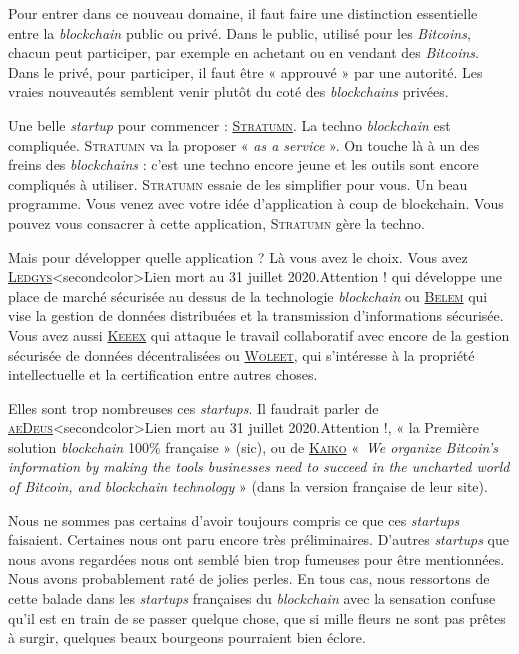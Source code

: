 Pour entrer dans ce nouveau domaine, il faut faire une distinction essentielle entre la \textit{blockchain} public ou privé. Dans le public, utilisé pour les \textit{Bitcoins}, chacun peut participer, par exemple en achetant ou en vendant des \textit{Bitcoins}. Dans le privé, pour participer, il faut être « approuvé » par une autorité. Les vraies nouveautés semblent venir plutôt du coté des \textit{blockchains} privées.

Une belle \textit{startup} pour commencer : \href{https://www.stratumn.com/}{\textsc{Stratumn}}. La techno \textit{blockchain} est compliquée. \textsc{Stratumn} va la proposer « \textit{as a service} ». On touche là à un des freins des \textit{blockchains} : c’est une techno encore jeune et les outils sont encore compliqués à utiliser. \textsc{Stratumn} essaie de les simplifier pour vous. Un beau programme. Vous venez avec votre idée d’application à coup de blockchain. Vous pouvez vous consacrer à cette application, \textsc{Stratumn} gère la techno.

Mais pour développer quelle application ? Là vous avez le choix. Vous avez \href{http://ledgys.io/}{\textsc{Ledgys}}\caution[t]<secondcolor>{Lien mort au 31 juillet 2020.}{Attention !} qui développe une place de marché sécurisée au dessus de la technologie \textit{blockchain} ou \href{https://belem.io/}{\textsc{Belem}} qui vise la gestion de données distribuées et la transmission d’informations sécurisée. Vous avez aussi \href{https://keeex.me/fr/}{\textsc{Keeex}} qui attaque le travail collaboratif avec encore de la gestion sécurisée de données décentralisées ou \href{https://www.woleet.io/}{\textsc{Woleet}}, qui s’intéresse à la propriété intellectuelle et la certification entre autres choses.

Elles sont trop nombreuses ces \textit{startups}. Il faudrait parler de \href{www.aedeus.com}{\textsc{aeDeus}}\caution[t]<secondcolor>{Lien mort au 31 juillet 2020.}{Attention !}, « la Première solution \textit{blockchain} 100\% française » (sic), ou de \href{https://www.kaiko.com/}{\textsc{Kaiko}} «~\textit{We organize Bitcoin’s information by making the tools businesses need to succeed in the uncharted world of Bitcoin, and blockchain technology} » (dans la version française de leur site).

Nous ne sommes pas certains d’avoir toujours compris ce que ces \textit{startups} faisaient. Certaines nous ont paru encore très préliminaires. D’autres \textit{startups} que nous avons regardées nous ont semblé bien trop fumeuses pour être mentionnées. Nous avons probablement raté de jolies perles. En tous cas, nous ressortons de cette balade dans les \textit{startups} françaises du \textit{blockchain} avec la sensation confuse qu’il est en train de se passer quelque chose, que si mille fleurs ne sont pas prêtes à surgir, quelques beaux bourgeons pourraient bien éclore.

